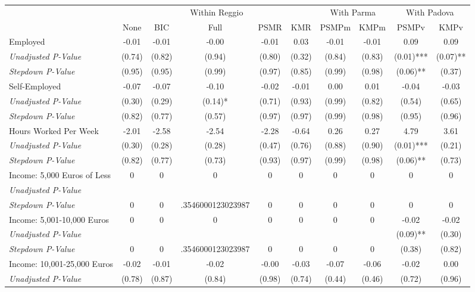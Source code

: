 \begin{tabular}{l c c c c c c c c c}
\toprule
& \multicolumn{5}{c}{Within Reggio} & \multicolumn{2}{c}{With Parma} & \multicolumn{2}{c}{With Padova} \\\cmidrule(lr){2-6} \cmidrule(lr){7-8} \cmidrule(lr){9-10}
 & None & BIC & Full & PSMR & KMR & PSMPm & KMPm & PSMPv & KMPv \\
\midrule
Employed & -0.01 & -0.01 & -0.00 & -0.01 & 0.03 & -0.01 & -0.01 & 0.09 & 0.09 \\
\quad \textit{Unadjusted P-Value} & (0.74) & (0.82) & (0.94) & (0.80) & (0.32) & (0.84) & (0.83) & (0.01)*** & (0.07)** \\
\quad \textit{Stepdown P-Value} & (0.95) & (0.95) & (0.99) & (0.97) & (0.85) & (0.99) & (0.98) & (0.06)** & (0.37) \\
Self-Employed & -0.07 & -0.07 & -0.10 & -0.02 & -0.01 & 0.00 & 0.01 & -0.04 & -0.03 \\
\quad \textit{Unadjusted P-Value} & (0.30) & (0.29) & (0.14)* & (0.71) & (0.93) & (0.99) & (0.82) & (0.54) & (0.65) \\
\quad \textit{Stepdown P-Value} & (0.82) & (0.77) & (0.57) & (0.97) & (0.97) & (0.99) & (0.98) & (0.95) & (0.96) \\
Hours Worked Per Week & -2.01 & -2.58 & -2.54 & -2.28 & -0.64 & 0.26 & 0.27 & 4.79 & 3.61 \\
\quad \textit{Unadjusted P-Value} & (0.30) & (0.28) & (0.28) & (0.47) & (0.76) & (0.88) & (0.90) & (0.01)*** & (0.21) \\
\quad \textit{Stepdown P-Value} & (0.82) & (0.77) & (0.73) & (0.93) & (0.97) & (0.99) & (0.98) & (0.06)** & (0.73) \\
Income: 5,000 Euros of Less & 0 & 0 & 0 & 0 & 0 & 0 & 0 & 0 & 0 \\
\quad \textit{Unadjusted P-Value} & & & & & & & & & \\
\quad \textit{Stepdown P-Value} & 0 & 0 & .3546000123023987 & 0 & 0 & 0 & 0 & 0 & 0 \\
Income: 5,001-10,000 Euros & 0 & 0 & 0 & 0 & 0 & 0 & 0 & -0.02 & -0.02 \\
\quad \textit{Unadjusted P-Value} & & & & & & & & (0.09)** & (0.30) \\
\quad \textit{Stepdown P-Value} & 0 & 0 & .3546000123023987 & 0 & 0 & 0 & 0 & (0.38) & (0.82) \\
Income: 10,001-25,000 Euros & -0.02 & -0.01 & -0.02 & -0.00 & -0.03 & -0.07 & -0.06 & -0.02 & 0.00 \\
\quad \textit{Unadjusted P-Value} & (0.78) & (0.87) & (0.84) & (0.98) & (0.74) & (0.44) & (0.46) & (0.72) & (0.96) \\

\end{tabular}

